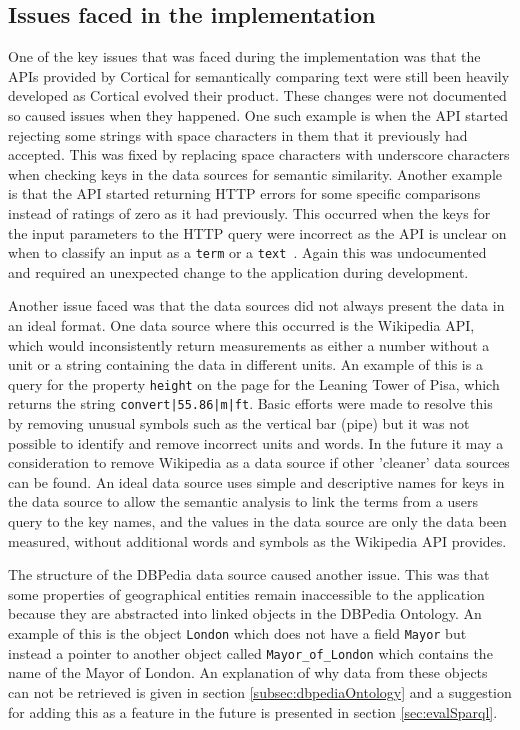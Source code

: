 \documentclass[authoryearcitations]{UoYCSproject}
\begin{document}
\subsection{Issues faced in the implementation}
One of the key issues that was faced during the implementation was that the APIs provided by Cortical for semantically comparing text were still been heavily developed as Cortical evolved their product. These changes were not documented so caused issues when they happened. One such example is when the API started rejecting some strings with space characters in them that it previously had accepted. This was fixed by replacing space characters with underscore characters when checking keys in the data sources for semantic similarity. Another example is that the API started returning HTTP errors for some specific comparisons instead of ratings of zero as it had previously. This occurred when the keys for the input parameters to the HTTP query were incorrect as the API is unclear on when to classify an input as a \texttt{term} or a \texttt{text}~\cite{serviceCorticalSim}. Again this was undocumented and required an unexpected change to the application during development.

Another issue faced was that the data sources did not always present the data in an ideal format. One data source where this occurred is the Wikipedia API, which would inconsistently return measurements as either a number without a unit or a string containing the data in different units. An example of this is a query for the property \texttt{height} on the page for the Leaning Tower of Pisa, which returns the string \texttt{convert|55.86|m|ft}. Basic efforts were made to resolve this by removing unusual symbols such as the vertical bar (pipe) but it was not possible to identify and remove incorrect units and words. In the future it may a consideration to remove Wikipedia as a data source if other 'cleaner' data sources can be found. An ideal data source uses simple and descriptive names for keys in the data source to allow the semantic analysis to link the terms from a users query to the key names, and the values in the data source are only the data been measured, without additional words and symbols as the Wikipedia API provides.

The structure of the DBPedia data source caused another issue. This was that some properties of geographical entities remain inaccessible to the application because they are abstracted into linked objects in the DBPedia Ontology. An example of this is the object \texttt{London} which does not have a field \texttt{Mayor} but instead a pointer to another object called \texttt{Mayor\_of\_London} which contains the name of the Mayor of London. An explanation of why data from these objects can not be retrieved is given in section \ref{subsec:dbpediaOntology} and a suggestion for adding this as a feature in the future is presented in section \ref{sec:evalSparql}.
\end{document}
